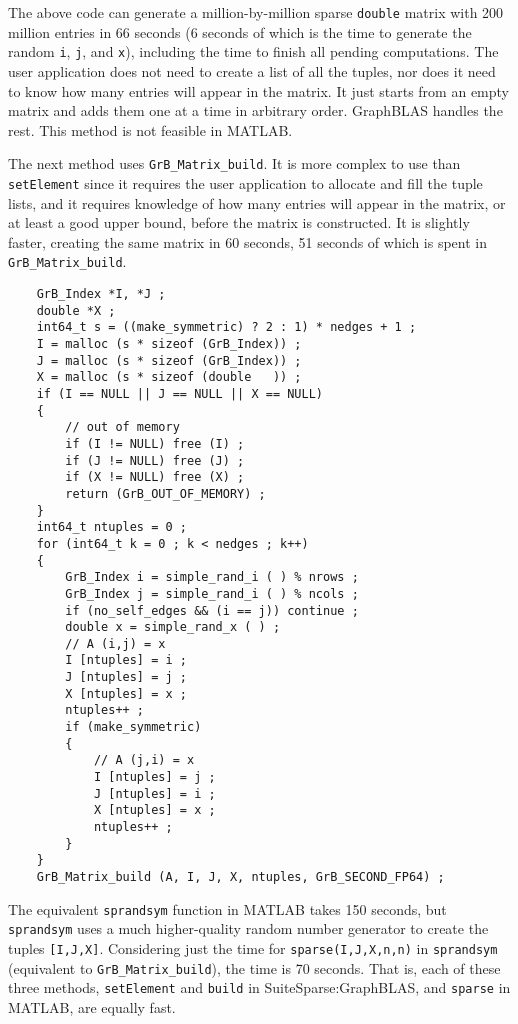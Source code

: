 \documentclass[12pt]{article}
\begin{document}
The above code can generate a million-by-million sparse \verb'double' matrix
with 200 million entries in 66 seconds (6 seconds of which is the time to
generate the random \verb'i', \verb'j', and \verb'x'), including the time
to finish all pending computations.  The user application does not need to
create a list of all the tuples, nor does it need to know how many entries will
appear in the matrix.  It just starts from an empty matrix and adds them one at
a time in arbitrary order.  GraphBLAS handles the rest.  This method is not
feasible in MATLAB.

The next method uses \verb'GrB_Matrix_build'.  It is more complex to use than
\verb'setElement' since it requires the user application to allocate and fill
the tuple lists, and it requires knowledge of how many entries will appear in
the matrix, or at least a good upper bound, before the matrix is constructed.
It is slightly faster, creating the same matrix in 60 seconds, 51 seconds
of which is spent in \verb'GrB_Matrix_build'.

    {\footnotesize
    \begin{verbatim}
    GrB_Index *I, *J ;
    double *X ;
    int64_t s = ((make_symmetric) ? 2 : 1) * nedges + 1 ;
    I = malloc (s * sizeof (GrB_Index)) ;
    J = malloc (s * sizeof (GrB_Index)) ;
    X = malloc (s * sizeof (double   )) ;
    if (I == NULL || J == NULL || X == NULL)
    {
        // out of memory
        if (I != NULL) free (I) ;
        if (J != NULL) free (J) ;
        if (X != NULL) free (X) ;
        return (GrB_OUT_OF_MEMORY) ;
    }
    int64_t ntuples = 0 ;
    for (int64_t k = 0 ; k < nedges ; k++)
    {
        GrB_Index i = simple_rand_i ( ) % nrows ;
        GrB_Index j = simple_rand_i ( ) % ncols ;
        if (no_self_edges && (i == j)) continue ;
        double x = simple_rand_x ( ) ;
        // A (i,j) = x
        I [ntuples] = i ;
        J [ntuples] = j ;
        X [ntuples] = x ;
        ntuples++ ;
        if (make_symmetric)
        {
            // A (j,i) = x
            I [ntuples] = j ;
            J [ntuples] = i ;
            X [ntuples] = x ;
            ntuples++ ;
        }
    }
    GrB_Matrix_build (A, I, J, X, ntuples, GrB_SECOND_FP64) ; \end{verbatim}}

The equivalent \verb'sprandsym' function in MATLAB takes 150 seconds, but
\verb'sprandsym' uses a much higher-quality random number generator to create
the tuples \verb'[I,J,X]'.  Considering just the time for
\verb'sparse(I,J,X,n,n)' in \verb'sprandsym' (equivalent to
\verb'GrB_Matrix_build'), the time is 70 seconds.  That is, each of these three
methods, \verb'setElement' and \verb'build' in SuiteSparse:GraphBLAS, and
\verb'sparse' in MATLAB, are equally fast.
\end{document}
